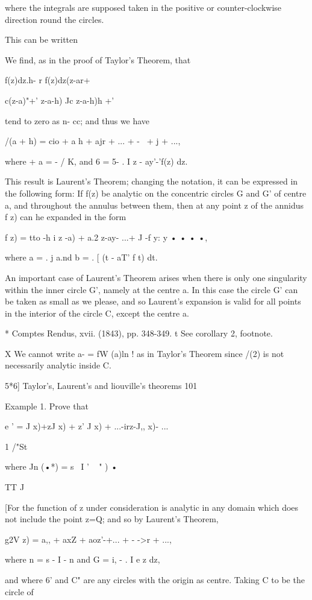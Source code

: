 {{where the integrals are supposed taken in the positive or
counter-clockwise direction round the circles.

This can be written

We find, as in the proof of Taylor's Theorem, that

f(z)dz.h- r f(z)dz(z-ar+

c(z-a)"+' z-a-h) Jc z-a-h)h +'

tend to zero as n- cc; and thus we have

/(a + h) = cio + a h + ajr + ... + -~ + j + ...,

where + a = - / K, and 6 = 5- . I z - ay'-'f(z) dz.

This result is Laurent's Theorem; changing the notation, it can be
expressed in the following form: If f(z) be analytic on the concentric
circles G and G' of centre a, and throughout the annulus between them,
then at any point z of the annidus f z) can he expanded in the form

f z) = tto -h i z -a) + a.2 z-ay- ...+ J -f y: y • • • •,

where a = . j a.nd b = . [ (t - aT' f t) dt.

An important case of Laurent's Theorem arises when there is only one
singularity within the inner circle G', namely at the centre a. In
this case the circle G' can be taken as small as we please, and so
Laurent's expansion is valid for all points in the interior of the
circle C, except the centre a.

* Comptes Rendus, xvii. (1843), pp. 348-349. t See corollary 2,
footnote.

X We cannot write a- = fW (a)ln ! as in Taylor's Theorem since /(2) is
not necessarily analytic inside C.

5*6] Taylor's, Laurent's and liouville's theorems 101

Example 1. Prove that

e ' = J x)+zJ x) + z' J x) + ...-irz-J,, x)- ...

1 /"St

where Jn (•*) = s~ I ' ~ " ) •

 TT J

[For the function of z under consideration is analytic in any domain
which does not include the point z=Q; and so by Laurent's Theorem,

g2V z) = a,, + axZ + aoz'-+... + - ->r + ...,

where n = s - I - n and G = i, - . I e z dz,

and where 6' and C" are any circles with the origin as centre. Taking
C to be the circle of

}}

